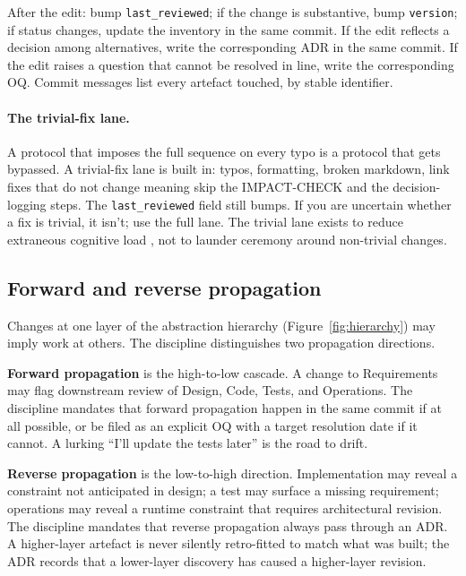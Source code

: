 \documentclass[11pt,a4paper,twocolumn]{article}
\begin{document}
After the edit: bump \texttt{last\_reviewed}; if the change is
substantive, bump \texttt{version}; if status changes, update the
inventory in the same commit. If the edit reflects a decision among
alternatives, write the corresponding ADR in the same commit. If
the edit raises a question that cannot be resolved in line, write
the corresponding OQ. Commit messages list every artefact touched,
by stable identifier.

\paragraph{The trivial-fix lane.} A protocol that imposes the full
sequence on every typo is a protocol that gets bypassed. A
trivial-fix lane is built in: typos, formatting, broken markdown,
link fixes that do not change meaning skip the IMPACT-CHECK and the
decision-logging steps. The \texttt{last\_reviewed} field still
bumps. If you are uncertain whether a fix is trivial, it isn't; use
the full lane. The trivial lane exists to reduce extraneous
cognitive load \citep{sweller1988cognitive}, not to launder
ceremony around non-trivial changes.

\subsection{Forward and reverse propagation}

Changes at one layer of the abstraction hierarchy
(Figure~\ref{fig:hierarchy}) may imply work at others. The
discipline distinguishes two propagation directions.

\textbf{Forward propagation} is the high-to-low cascade. A change
to Requirements may flag downstream review of Design, Code, Tests,
and Operations. The discipline mandates that forward propagation
happen in the same commit if at all possible, or be filed as an
explicit OQ with a target resolution date if it cannot. A lurking
``I'll update the tests later'' is the road to drift.

\textbf{Reverse propagation} is the low-to-high direction.
Implementation may reveal a constraint not anticipated in design;
a test may surface a missing requirement; operations may reveal a
runtime constraint that requires architectural revision. The
discipline mandates that reverse propagation always pass through an
ADR. A higher-layer artefact is never silently retro-fitted to
match what was built; the ADR records that a lower-layer discovery
has caused a higher-layer revision.
\end{document}
